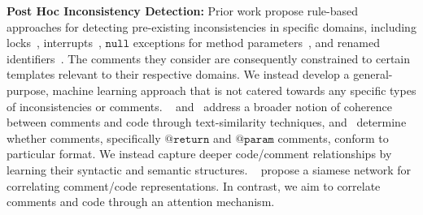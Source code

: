 \documentclass[letterpaper]{article} %
\makeatletter
\newcommand{\CodeIn}[1]{{\ifmmode{\mathtt{#1}}\else$\mathtt{#1}$\fi}}
\newcommand{\Return}{\CodeIn{@return}}
\newcommand{\Param}{\CodeIn{@param}}
\makeatother
\begin{document}
\noindent\textbf{Post Hoc Inconsistency Detection:}
\vspace{-3.31mm}
\vspace{-1.65mm}
Prior work propose rule-based approaches for detecting pre-existing inconsistencies in specific domains, including locks~\cite{icomment2007}, interrupts~\cite{aComment}, \CodeIn{null} exceptions for method parameters~\cite{ZhouParameter,tComment}, and renamed identifiers~\cite{ratol2017fragile}. The comments they consider are consequently constrained to certain templates relevant to their respective domains. We instead develop a general-purpose, machine learning approach that is not catered towards any specific types of inconsistencies or comments. \citeauthor{Corazza18}~ and~\citet{Cimasa19} address a broader notion of coherence between comments and code through text-similarity techniques, and~\citet{Khamis2010AutomaticQA} determine whether comments, specifically \Return{} and \Param{} comments, conform to particular format. We instead capture deeper code/comment relationships by learning their syntactic and semantic structures. ~\citet{RabbiInconsistencySiamese} propose a siamese network
for correlating comment/code representations. In contrast, we aim to correlate comments and code through an attention mechanism.
\end{document}
